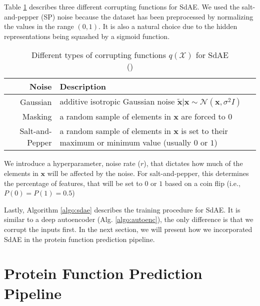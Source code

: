 \par Table \ref{exp:noise_types} describes three different
corrupting functions for SdAE. We used the salt-and-pepper (SP)
noise because the dataset has been preprocessed by normalizing
the values in the range $(0,1)$. It is also a natural choice due
to the hidden representations being squashed by a sigmoid function.

\begin{table}[!h]
  \centering
  \caption[Different types of corrupting functions $q(\mathcal{X}) for SdAE$]
  {Different types of corrupting functions $q(\mathcal{X})$ for SdAE\\
  (\cite{vincent2010stacked})}
  \label{exp:noise_types}
  \begin{tabular}{@{}rp{}@{}}
      \toprule
      Noise                  & Description                                                   \\ \midrule
      Gaussian               & additive isotropic Gaussian noise $\mathbf{\widetilde{x}} |
                              \mathbf{x} \sim \mathcal{N}(\mathbf{x}, \sigma^2 I)$           \\
      Masking                & a random sample of elements in $\mathbf{x}$ are forced to $0$ \\
      Salt-and-Pepper        & a random sample of elements in $\mathbf{x}$ is set to their
                               maximum or minimum value (usually $0$ or $1$)                 \\\bottomrule
  \end{tabular}
\end{table}

\par We introduce a hyperparameter, noise rate ($r$), that dictates how much
of the elements in $\mathbf{x}$ will be affected by the noise. For
salt-and-pepper, this determines the percentage of features, that will be set
to $0$ or $1$ based on a coin flip (i.e., $P(0) = P(1) = 0.5$)


\par Lastly, Algorithm \ref{algo:sdae} describes the training procedure for SdAE.
It is similar to a deep autoencoder (Alg. \ref{algo:autoenc}), the only difference
is that we corrupt the inputs first. In the next section, we will present how
we incorporated SdAE in the protein function prediction pipeline.



\section{Protein Function Prediction Pipeline}
\label{SDPipeline}

